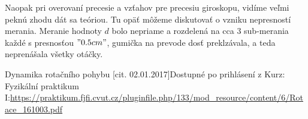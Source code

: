 \documentclass[a4paper,10pt]{article}
\begin{document}
Naopak pri overovaní precesie a vzťahov pre precesiu giroskopu, vidíme veľmi peknú zhodu dát sa teóriou. 
Tu opäť môžeme diskutovať o vzniku nepresností merania. Meranie hodnoty $d$ bolo nepriame a rozdelená na cca 3 sub-merania každé s presnosťou $"0.5 cm"$, gumička na prevode dosť preklzávala, a teda neprenášala všetky otáčky. 


\begin{thebibliography}{2}
Dynamika rotačního pohybu [cit. 02.01.2017]Dostupné po prihlásení z Kurz: Fyzikální praktikum I:\url{https://praktikum.fjfi.cvut.cz/pluginfile.php/133/mod_resource/content/6/Rotace_161003.pdf}

\end{thebibliography}
\end{document}
